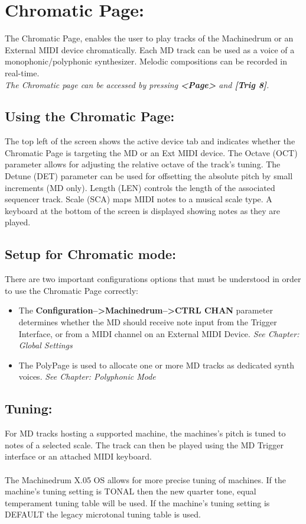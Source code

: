 \chapter{Chromatic Page:}
The Chromatic Page, enables the user to play tracks of the Machinedrum or an External MIDI device chromatically. Each MD track can be used as a voice of a monophonic/polyphonic synthesizer. Melodic compositions can be recorded in real-time.
\\
\textit{The Chromatic page can be accessed by pressing \textbf{<Page>} and \textbf{[Trig 8]}.}
\\
\section{Using the Chromatic Page:}
The top left of the screen shows the active device tab and indicates whether the Chromatic Page is targeting the MD or an Ext MIDI device.
The Octave (OCT) parameter allows for adjusting the relative octave of the track's tuning. The Detune (DET) parameter can be used for offsetting the absolute pitch by small increments (MD only). Length (LEN) controls the length of the associated sequencer track. Scale (SCA) maps MIDI notes to a musical scale type.
A keyboard at the bottom of the screen is displayed showing notes as they are played.
\newpage
\section{Setup for Chromatic mode:}
There are two important configurations options that must be understood in order to use the Chromatic Page correctly:
\begin{itemize}
    \item The \textbf{Configuration-->Machinedrum-->CTRL CHAN} parameter determines whether the MD should receive note input from the Trigger Interface, or from a MIDI channel on an External MIDI Device. \textit{See Chapter: Global Settings}
    \item The PolyPage is used to allocate one or more MD tracks as dedicated synth voices. \textit{See Chapter: Polyphonic Mode} 
\end{itemize}

\section{Tuning:}
For MD tracks hosting a supported machine, the machines’s pitch is tuned to notes of a selected scale. The track can then be played using the MD Trigger interface or an attached MIDI keyboard.\\\\
The Machinedrum X.05 OS allows for more precise tuning of machines. If the machine's tuning setting is TONAL then the new quarter tone, equal temperament tuning table will be used. If the machine's tuning setting is DEFAULT the legacy microtonal tuning table is used.
\\

